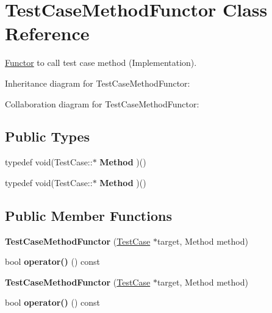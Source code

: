 \hypertarget{class_test_case_method_functor}{\section{Test\+Case\+Method\+Functor Class Reference}
\label{class_test_case_method_functor}
}


\hyperlink{class_functor}{Functor} to call test case method (Implementation).  




Inheritance diagram for Test\+Case\+Method\+Functor\+:


Collaboration diagram for Test\+Case\+Method\+Functor\+:
\subsection*{Public Types}
\begin{DoxyCompactItemize}
\item 
\hypertarget{class_test_case_method_functor_a7e82dac874a97fd3528725706c921d6c}{typedef void(Test\+Case\+::$\ast$ {\bfseries Method} )()}\label{class_test_case_method_functor_a7e82dac874a97fd3528725706c921d6c}

\item 
\hypertarget{class_test_case_method_functor_a7e82dac874a97fd3528725706c921d6c}{typedef void(Test\+Case\+::$\ast$ {\bfseries Method} )()}\label{class_test_case_method_functor_a7e82dac874a97fd3528725706c921d6c}

\end{DoxyCompactItemize}
\subsection*{Public Member Functions}
\begin{DoxyCompactItemize}
\item 
\hypertarget{class_test_case_method_functor_a854e6f42ff0f83db6fb91944917e51c2}{{\bfseries Test\+Case\+Method\+Functor} (\hyperlink{class_test_case}{Test\+Case} $\ast$target, Method method)}\label{class_test_case_method_functor_a854e6f42ff0f83db6fb91944917e51c2}

\item 
\hypertarget{class_test_case_method_functor_ad5a8eb9890f9f8ab07596abc64a0fffa}{bool {\bfseries operator()} () const }\label{class_test_case_method_functor_ad5a8eb9890f9f8ab07596abc64a0fffa}

\item 
\hypertarget{class_test_case_method_functor_a854e6f42ff0f83db6fb91944917e51c2}{{\bfseries Test\+Case\+Method\+Functor} (\hyperlink{class_test_case}{Test\+Case} $\ast$target, Method method)}\label{class_test_case_method_functor_a854e6f42ff0f83db6fb91944917e51c2}

\item 
\hypertarget{class_test_case_method_functor_ad5a8eb9890f9f8ab07596abc64a0fffa}{bool {\bfseries operator()} () const }\label{class_test_case_method_functor_ad5a8eb9890f9f8ab07596abc64a0fffa}

\end{DoxyCompactItemize}


